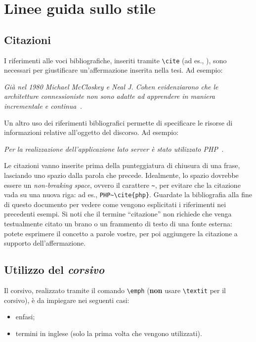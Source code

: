 \clearpage{\pagestyle{empty}\cleardoublepage}
\chapter{Linee guida sullo stile}
\label{chap:style}

\section{Citazioni}

I riferimenti alle voci bibliografiche, inseriti tramite \verb|\cite| (ad es., \cite{esempio_citazione}), sono necessari per giustificare un'affermazione inserita nella tesi. Ad esempio:

\noindent\emph{Già nel 1980 Michael McCloskey e Neal J. Cohen evidenziarono che le architetture connessioniste non sono adatte ad apprendere in maniera incrementale e continua~\cite{mccloskey1989catastrophic}.}

Un altro uso dei riferimenti bibliografici permette di specificare le risorse di informazioni relative all'oggetto del discorso. Ad esempio:

\noindent\emph{Per la realizzazione dell'applicazione lato server è stato utilizzato PHP~\cite{php}.}

Le citazioni vanno inserite prima della punteggiatura di chiusura di una frase, lasciando uno spazio dalla parola che precede. Idealmente, lo spazio dovrebbe essere un \emph{non-breaking space}, ovvero il carattere \texttt{\~}, per evitare che la citazione vada su una nuova riga: ad es., \verb|PHP~\cite{php}|. Guardate la bibliografia alla fine di questo documento per vedere come vengono esplicitati i riferimenti nei precedenti esempi. 
Si noti che il termine ``citazione'' non richiede che venga testualmente citato un brano o un frammento di testo di una fonte esterna: potete esprimere il concetto a parole vostre, per poi aggiungere la citazione a supporto dell'affermazione.

\section{Utilizzo del \emph{corsivo}}

Il corsivo, realizzato tramite il comando \verb|\emph| (\textbf{non} usare \verb|\textit| per il corsivo), è da impiegare nei seguenti casi:
\begin{itemize}
 \item enfasi;
 \item termini in inglese (solo la prima volta che vengono utilizzati).
\end{itemize}


